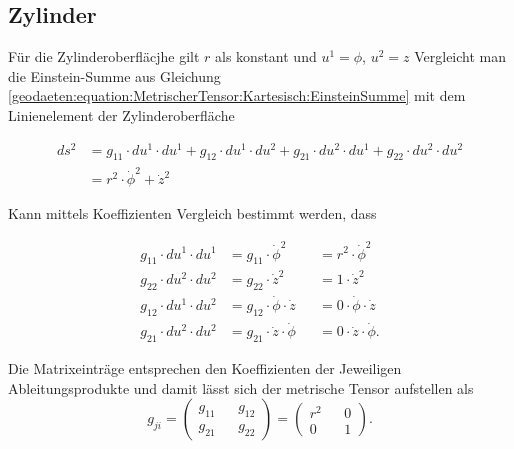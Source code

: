 %
%
%
%
\subsection{Zylinder\label{geodaeten:section:MetrischerTensor:Zylinder}}

Für die Zylinderoberfläcjhe gilt $r$ als konstant und $u^1 = \phi$, $u^2 =z$ 
Vergleicht man die Einstein-Summe aus Gleichung \ref{geodaeten:equation:MetrischerTensor:Kartesisch:EinsteinSumme} mit dem Linienelement der Zylinderoberfläche

\begin{equation}
	\begin{aligned}
	ds^2 &= g_{11} \cdot du^1 \cdot du^1 + g_{12} \cdot du^1 \cdot du^2 + g_{21} \cdot du^2 \cdot du^1 + g_{22} \cdot du^2 \cdot du^2 \\
	&= r^2 \cdot \dot{\phi}^2 +\dot{z}^2
	\end{aligned}
\end{equation}
 
Kann mittels Koeffizienten Vergleich bestimmt werden, dass 

\begin{equation}
	\begin{alignedat}{3}
		g_{11} \cdot du^1 \cdot du^1 &= g_{11} \cdot \dot{\phi}^2 & &= r^2 \cdot \dot{\phi}^2 \\
		g_{22} \cdot du^2 \cdot du^2 &= g_{22} \cdot \dot{z}^2    & &= 1 \cdot \dot{z}^2 \\
		g_{12} \cdot du^1 \cdot du^2 &= g_{12} \cdot \dot{\phi} \cdot \dot{z} & &= 0 \cdot \dot{\phi} \cdot \dot{z} \\
		g_{21} \cdot du^2 \cdot du^2 &= g_{21} \cdot \dot{z} \cdot \dot{\phi} & &= 0 \cdot \dot{z} \cdot \dot{\phi} .
	\end{alignedat}
\end{equation}

Die Matrixeinträge entsprechen den Koeffizienten der Jeweiligen Ableitungsprodukte und damit lässt sich der metrische Tensor aufstellen als
\begin{equation}
	g_{ji} =\begin{pmatrix} g_{11} && g_{12} \\ g_{21} && g_{22} \end{pmatrix}= \begin{pmatrix} r^2 && 0 \\ 0 && 1 \end{pmatrix} .
\end{equation}


